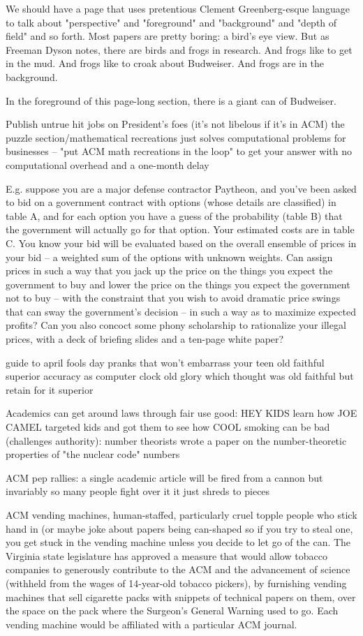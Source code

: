 We should have a page that uses pretentious Clement Greenberg-esque language to talk about "perspective" and "foreground" and "background" and "depth of field" and so forth. Most papers are pretty boring: a bird's eye view. But as Freeman Dyson notes, there are birds and frogs in research. And frogs like to get in the mud. And frogs like to croak about Budweiser. And frogs are in the background.

In the foreground of this page-long section, there is a giant can of Budweiser.

Publish untrue hit jobs on President's foes (it's not libelous if it's in ACM)
the puzzle section/mathematical recreations just solves computational problems for businesses -- "put ACM math recreations in the loop" to get your answer with no computational overhead and a one-month delay

E.g. suppose you are a major defense contractor Paytheon, and you've been asked to bid on a government contract with options (whose details are classified) in table A, and for each option you have a guess of the probability (table B) that the government will actually go for that option. Your estimated costs are in table C. You know your bid will be evaluated based on the overall ensemble of prices in your bid -- a weighted sum of the options with unknown weights. Can assign prices in such a way that you jack up the price on the things you expect the government to buy and lower the price on the things you expect the government not to buy -- with the constraint that you wish to avoid dramatic price swings that can sway the government's decision -- in such a way as to maximize expected profits? Can you also concoct some phony scholarship to rationalize your illegal prices, with a deck of briefing slides and a ten-page white paper?

guide to april fools day pranks that won't embarrass your teen
old faithful superior accuracy as computer clock
old glory which thought was old faithful but retain for it superior

Academics can get around laws through fair use
good: HEY KIDS learn how JOE CAMEL targeted kids and got them to see how COOL smoking can be
bad (challenges authority): number theorists wrote a paper on the number-theoretic properties of "the nuclear code" numbers

ACM pep rallies: a single academic article will be fired from a cannon but invariably so many people fight over it it just shreds to pieces

ACM vending machines, human-staffed, particularly cruel topple people who stick hand in (or maybe joke about papers being can-shaped so if you try to steal one, you get stuck in the vending machine unless you decide to let go of the can. The Virginia state legislature has approved a measure that would allow tobacco companies to generously contribute to the ACM and the advancement of science (withheld from the wages of 14-year-old tobacco pickers), by furnishing vending machines that sell cigarette packs with snippets of technical papers on them, over the space on the pack where the Surgeon's General Warning used to go. Each vending machine would be affiliated with a particular ACM journal.